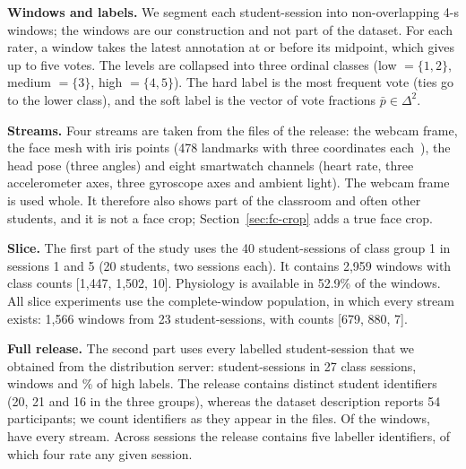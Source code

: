 \textbf{Windows and labels.} We segment each student-session into non-overlapping 4-s windows; the windows are our construction and not part of the dataset. For each rater, a window takes the latest annotation at or before its midpoint, which gives up to five votes. The levels are collapsed into three ordinal classes (low $=\{1,2\}$, medium $=\{3\}$, high $=\{4,5\}$). The hard label is the most frequent vote (ties go to the lower class), and the soft label is the vector of vote fractions $\bar p\in\Delta^{2}$.

\textbf{Streams.} Four streams are taken from the files of the release: the webcam frame, the face mesh with iris points (478 landmarks with three coordinates each~\cite{kartynnik2019facemesh,grishchenko2020attentionmesh}), the head pose (three angles) and eight smartwatch channels (heart rate, three accelerometer axes, three gyroscope axes and ambient light). The webcam frame is used whole. It therefore also shows part of the classroom and often other students, and it is not a face crop; Section~\ref{sec:fc-crop} adds a true face crop.

\textbf{Slice.} The first part of the study uses the 40 student-sessions of class group 1 in sessions 1 and 5 (20 students, two sessions each). It contains 2{,}959 windows with class counts [1{,}447, 1{,}502, 10]. Physiology is available in 52.9\% of the windows. All slice experiments use the complete-window population, in which every stream exists: 1{,}566 windows from 23 student-sessions, with counts [679, 880, 7].

\textbf{Full release.} The second part uses every labelled student-session that we obtained from the distribution server: \fcSessions{} student-sessions in 27 class sessions, \fcWindows{} windows and \fcShareHigh\% of high labels. The release contains \fcPersons{} distinct student identifiers (20, 21 and 16 in the three groups), whereas the dataset description reports 54 participants; we count identifiers as they appear in the files. Of the windows, \fcComplete{} have every stream. Across sessions the release contains five labeller identifiers, of which four rate any given session.


